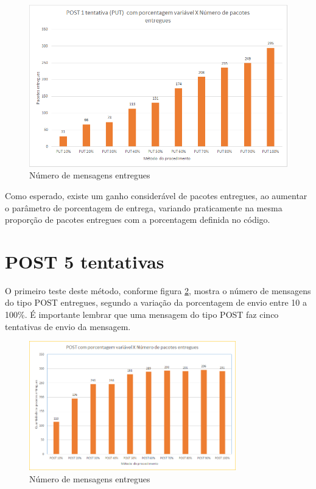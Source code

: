 \begin{figure}[!htb]
	\centering
	\includegraphics[width=.8\textwidth]{../imagens/PUTxNumentregues}
	\caption{Número de mensagens entregues}
	\label{fig:put_num_entregues}
\end{figure}

Como esperado, existe um ganho considerável de pacotes entregues, ao aumentar o parâmetro de porcentagem de entrega, variando praticamente na mesma proporção de pacotes entregues com a porcentagem definida no código.

\section{POST 5 tentativas}

O primeiro teste deste método, conforme figura \ref{fig:post_num_entregues}, mostra o número de mensagens do tipo POST entregues, segundo a variação da porcentagem de envio entre 10 a 100\%.
É importante lembrar que uma mensagem do tipo POST faz cinco tentativas de envio da mensagem.

\begin{figure}[!htb]
	\centering
	\includegraphics[width=0.8\textwidth]{../imagens/POSTxNumEntregues}
	\caption{Número de mensagens entregues}
	\label{fig:post_num_entregues}
\end{figure}
\hfill \break
\hfill \break
\hfill \break
\hfill \break
\hfill \break

